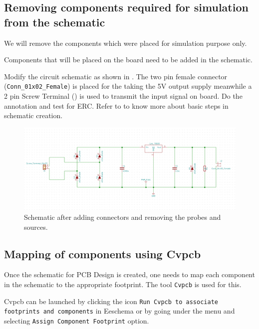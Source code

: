 

\subsection{Removing components required for simulation from the schematic}
\begin{itemsize}
\item We will remove the components which were placed for simulation purpose only.
\item Components that will be placed on the board need to be added in the schematic.
\item Modify the circuit schematic as shown in . The two pin female connector (\texttt{Conn\_01x02\_Female}) is placed for the taking the 5V output supply meanwhile a 2 pin Screw Terminal () is used to transmit the input signal on board. Do the annotation and test for ERC.  Refer to  to know more about basic steps in schematic creation. 
\begin{figure}
\centering
\includegraphics[width=\lgfig]{NGHDL/pcbschwithconn.png}
\caption{Schematic after adding connectors and removing the probes and sources.}
\label{pcbschconn}
\end{figure}
\end{itemsize}

\subsection{Mapping of components using Cvpcb}

\item Once the schematic for PCB Design is created, one needs to map each component
in the schematic to the appropriate footprint. The tool \texttt{Cvpcb} is
used for this.
\item Cvpcb can be launched by clicking the icon \texttt{Run Cvpcb to associate footprints and components} in Eeschema or by going under the  menu and selecting \texttt{Assign Component Footprint} option. 

